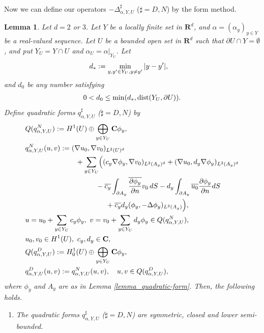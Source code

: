 \documentclass[12pt,a4paper]{article}
\newtheorem{lemma}[theorem]{Lemma}
\def\dist{\mathop{\rm dist}\nolimits}
\def\min{\mathop{\rm min}\limits}
\begin{document}
Now we can define our operators $-\Delta^\sharp_{\alpha, Y, U}$ 
($\sharp=D,N$) by the form method.
\begin{lemma}
 \label{lemma_DNdef}
Let $d=2$ or $3$. 
Let $Y$ be a locally finite set in $\mathbf{R}^d$,
and $\alpha=(\alpha_y)_{y\in Y}$ be a real-valued sequence.
Let $U$ be a bounded open set in $\mathbf{R}^d$
such that $\partial U\cap Y=\emptyset$,
and put $Y_U=Y\cap U$ and $\alpha_U=\alpha|_{Y_U}$.
Let
\begin{align*}
& d_*:=\min_{y,y'\in Y_U, y\not=y'}|y-y'|,
\end{align*}
and $d_0$ be any number satisfying
\begin{align*}
0< d_0\leq \min(d_*,\dist(Y_U,\partial U)).
\end{align*}
Define quadratic forms $q^\sharp_{\alpha,Y,U}$ ($\sharp=D,N$) by
\begin{align}
&Q(q^N_{\alpha,Y,U}):=
H^1(U)\oplus\bigoplus_{y\in Y_U}\mathbf{C}\phi_y,
\notag\\
&  q^N_{\alpha,Y,U}(u,v)
:=
(\nabla u_0,\nabla v_0)_{L^2(U)^d}\notag\\
&\hspace{2.5cm}
+
\sum_{y\in Y_U}
\Bigl(
(c_y \nabla \phi_y,\nabla v_0)_{L^2(A_y)^d}
+
(\nabla u_0,d_y \nabla \phi_y)_{L^2(A_y)^d}
\notag\\
&
\hspace{3.5cm}
-\overline{c_y}\int_{\partial A_y}\overline{\frac{\partial \phi_y}{\partial n}}v_0\,dS
-d_y\int_{\partial A_y}\overline{u_0}\frac{\partial \phi_y}{\partial n}dS
\notag\\
&\hspace{4cm}+
\overline{c_y}d_y(\phi_y,-\Delta \phi_y)_{L^2(A_y)}
\Bigr),
\label{06_13}
\\
&
u=u_0+\sum_{y\in Y_U}c_y \phi_y,\ 
v=v_0+\sum_{y\in Y_U}d_y \phi_y\in Q(q^N_{\alpha,Y,U}),\notag\\
&
u_0,v_0\in H^1(U),\ c_y,d_y\in \mathbf{C},
\notag\\
& Q(q^D_{\alpha,Y,U}):=H_0^1(U)\oplus\bigoplus_{y\in Y_U}\mathbf{C}\phi_y,
\notag\\
& q^D_{\alpha,Y,U}(u,v):=q^N_{\alpha,Y,U}(u,v),
\quad u,v\in Q(q^D_{\alpha,Y,U}),
\notag
\end{align}
where $\phi_y$ and $A_y$
are as in 
Lemma \ref{lemma_quadratic-form}.
Then, the following holds.
\begin{enumerate}
 \item[(1)] The quadratic forms
$q^\sharp_{\alpha,Y,U}$ ($\sharp=D,N$) are
symmetric, closed and lower semi-bounded.


\end{enumerate}
\end{lemma}
\end{document}
